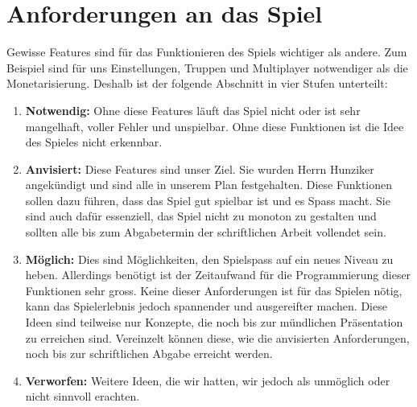 \section{Anforderungen an das Spiel}
\label{chap:foo}
Gewisse \glspl{Feature} sind für das Funktionieren des Spiels wichtiger als andere.
Zum Beispiel sind für uns Einstellungen, Truppen und \gls{Multiplayer} notwendiger als die Monetarisierung.
Deshalb ist der folgende Abschnitt in vier Stufen unterteilt:
\begin{enumerate}
    \item \textbf{Notwendig:}
        Ohne diese Features läuft das Spiel nicht oder ist sehr mangelhaft,
        voller Fehler und unspielbar. Ohne diese Funktionen ist die Idee des Spieles nicht erkennbar.
    \item \textbf{Anvisiert:}
        Diese Features sind unser Ziel. Sie wurden Herrn Hunziker angekündigt und sind alle in unserem Plan festgehalten.
        Diese Funktionen sollen dazu führen, dass das Spiel
        gut spielbar ist und es Spass macht. Sie sind auch dafür essenziell, das Spiel nicht zu monoton zu gestalten und sollten
        alle bis zum Abgabetermin der schriftlichen Arbeit vollendet sein.
    \item \textbf{Möglich:}
        Dies sind Möglichkeiten, den Spielspass auf ein neues Niveau zu heben. Allerdings benötigt ist der Zeitaufwand für die Programmierung dieser Funktionen sehr gross.
        Keine dieser Anforderungen ist für das Spielen nötig,
        kann das Spielerlebnis jedoch spannender und ausgereifter machen. Diese
        Ideen sind teilweise nur Konzepte, die noch bis zur mündlichen Präsentation zu erreichen sind.
        Vereinzelt können diese, wie die anvisierten Anforderungen, noch bis zur schriftlichen Abgabe erreicht werden.
    \item \textbf{Verworfen:}
        Weitere Ideen, die wir hatten, wir jedoch als unmöglich oder nicht sinnvoll erachten.
\end{enumerate}

